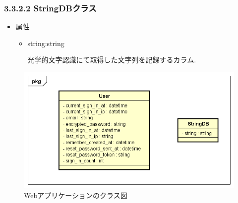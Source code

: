 \subsubsection{3.3.2.2 StringDBクラス}
\begin{itemize}
\item 属性

\begin{itemize}
\item string:string

光学的文字認識にて取得した文字列を記録するカラム.
\end{itemize}

\end{itemize}

\begin{figure}
\begin{center}
\includegraphics[width=17cm]{fig/class_web.png}
\end{center}
\caption{Webアプリケーションのクラス図}
\end{figure}

